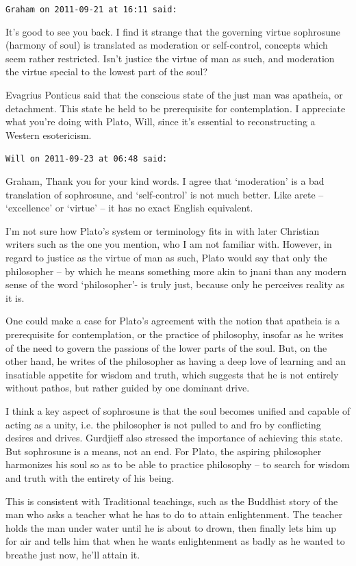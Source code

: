 \begin{footnotesize}
\begin{sffamily}
\texttt{Graham on 2011-09-21 at 16:11 said:}

It's good to see you back. I find it strange that the governing virtue sophrosune (harmony of soul) is translated as moderation or self-control, concepts which seem rather restricted. Isn't justice the virtue of man as such, and moderation the virtue special to the lowest part of the soul?

Evagrius Ponticus said that the conscious state of the just man was apatheia, or detachment. This state he held to be prerequisite for contemplation. I appreciate what you're doing with Plato, Will, since it's essential to reconstructing a Western esotericism.

\hfill

\texttt{Will on 2011-09-23 at 06:48 said:}

Graham, Thank you for your kind words. I agree that `moderation' is a bad translation of sophrosune, and `self-control' is not much better. Like arete -- `excellence' or `virtue' -- it has no exact English equivalent.

I'm not sure how Plato's system or terminology fits in with later Christian writers such as the one you mention, who I am not familiar with. However, in regard to justice as the virtue of man as such, Plato would say that only the philosopher -- by which he means something more akin to jnani than any modern sense of the word `philosopher'- is truly just, because only he perceives reality as it is.

One could make a case for Plato's agreement with the notion that apatheia is a prerequisite for contemplation, or the practice of philosophy, insofar as he writes of the need to govern the passions of the lower parts of the soul. But, on the other hand, he writes of the philosopher as having a deep love of learning and an insatiable appetite for wisdom and truth, which suggests that he is not entirely without pathos, but rather guided by one dominant drive.

I think a key aspect of sophrosune is that the soul becomes unified and capable of acting as a unity, i.e. the philosopher is not pulled to and fro by conflicting desires and drives. Gurdjieff also stressed the importance of achieving this state. But sophrosune is a means, not an end. For Plato, the aspiring philosopher harmonizes his soul so as to be able to practice philosophy -- to search for wisdom and truth with the entirety of his being.

This is consistent with Traditional teachings, such as the Buddhist story of the man who asks a teacher what he has to do to attain enlightenment. The teacher holds the man under water until he is about to drown, then finally lets him up for air and tells him that when he wants enlightenment as badly as he wanted to breathe just now, he'll attain it.


\hfill

\end{sffamily}
\end{footnotesize}

